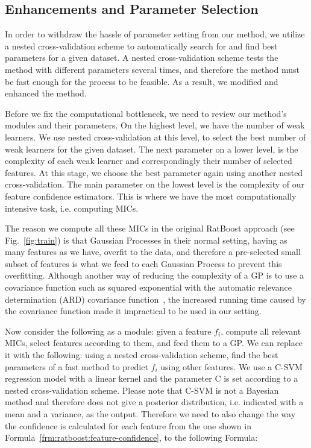 \subsection{Enhancements and Parameter Selection}
\label{sec:adaptive:ratboost-enhanced}
In order to withdraw the hassle of parameter setting from our method, we utilize a nested cross-validation scheme to automatically search for and find best parameters for a given dataset. A nested cross-validation scheme tests the method with different parameters several times, and therefore the method must be fast enough for the process to be feasible. As a result, we modified and enhanced the method.

Before we fix the computational bottleneck, we need to review our method's modules and their parameters. On the highest level, we have the number of weak learners. We use nested cross-validation at this level, to select the best number of weak learners for the given dataset. The next parameter on a lower level, is the complexity of each weak learner and correspondingly their number of selected features. At this stage, we choose the best parameter again using another nested cross-validation. The main parameter on the lowest level is the complexity of our feature confidence estimators. This is where we have the most computationally intensive task, i.e. computing MICs.

The reason we compute all these MICs in the original RatBoost approach (see Fig.~\ref{fig:train}) is that Gaussian Processes in their normal setting, having as many features as we have, overfit to the data, and therefore a pre-selected small subset of features is what we feed to each Gaussian Process to prevent this overfitting. Although another way of reducing the complexity of a GP is to use a covariance function such as squared exponential with the automatic relevance determination (ARD) covariance function~\cite{gaussian-processes}, the increased running time caused by the covariance function made it impractical to be used in our setting.

Now consider the following as a module: given a feature $f_i$, compute all relevant MICs, select features according to them, and feed them to a GP. We can replace it with the following: using a nested cross-validation scheme, find the best parameters of a fast method to predict $f_i$ using other features. We use a C-SVM regression model with a linear kernel and the parameter C is set according to a nested cross-validation scheme. Please note that C-SVM is not a Bayesian method and therefore does not give a posterior distribution, i.e. indicated with a mean and a variance, as the output. Therefore we need to also change the way the confidence is calculated for each feature from the one shown in Formula~\ref{frm:ratboost:feature-confidence}, to the following Formula:


